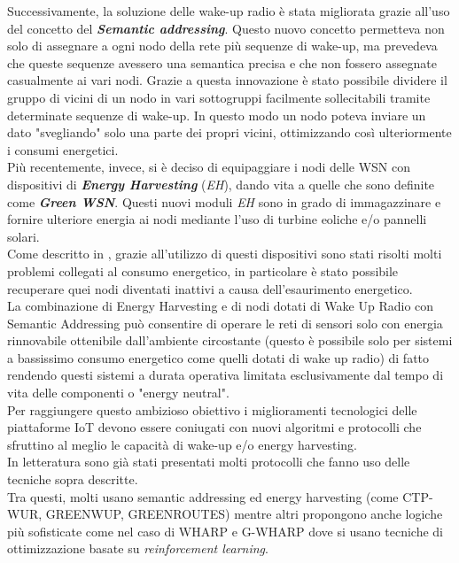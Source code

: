 Successivamente, la soluzione delle wake-up radio è stata migliorata grazie all'uso del concetto del \textbf{\textit{Semantic addressing}}. Questo nuovo concetto permetteva non solo di assegnare a ogni nodo della rete più sequenze di wake-up, ma prevedeva che queste sequenze avessero una semantica precisa e che non fossero assegnate casualmente ai vari nodi. Grazie a questa innovazione è stato possibile dividere il gruppo di vicini di un nodo in vari sottogruppi facilmente sollecitabili tramite determinate sequenze di wake-up. In questo modo un nodo poteva inviare un dato "svegliando" solo una parte dei propri vicini, ottimizzando così ulteriormente i consumi energetici.\\

Più recentemente, invece, si è deciso di equipaggiare i nodi delle WSN con dispositivi di \textbf{\textit{Energy Harvesting}} (\textit{EH}), dando vita a quelle che sono definite come \textbf{\textit{Green WSN}}. Questi nuovi moduli \textit{EH} sono in grado di immagazzinare e fornire ulteriore energia ai nodi mediante l'uso di turbine eoliche e/o pannelli solari.\\
Come descritto in \cite{energyHarvesting}, grazie all'utilizzo di questi dispositivi sono stati risolti molti problemi collegati al consumo energetico, in particolare è stato possibile recuperare quei nodi diventati inattivi a causa dell'esaurimento energetico.\\

La combinazione di Energy Harvesting e di nodi dotati di Wake Up Radio con Semantic Addressing può consentire di operare le reti di sensori solo con energia rinnovabile ottenibile dall'ambiente circostante (questo è possibile solo per sistemi a bassissimo consumo energetico come quelli dotati di wake up radio) di fatto rendendo questi sistemi a durata operativa limitata esclusivamente dal tempo di vita delle componenti o "energy neutral".\\

Per raggiungere questo ambizioso obiettivo i miglioramenti tecnologici delle piattaforme IoT devono essere coniugati con nuovi algoritmi e protocolli che sfruttino al meglio le capacità di wake-up e/o energy harvesting.\\
In letteratura sono già stati presentati molti protocolli che fanno uso delle tecniche sopra descritte.\\
Tra questi, molti usano semantic addressing ed energy harvesting (come CTP-WUR\cite{ctp-wur}, GREENWUP\cite{greenWup}, GREENROUTES\cite{greenRoutes}) mentre altri propongono anche logiche più sofisticate come nel caso di WHARP\cite{wharp} e G-WHARP\cite{estensioneWHARP} dove si usano tecniche di ottimizzazione basate su \textit{reinforcement learning}.\newpage


